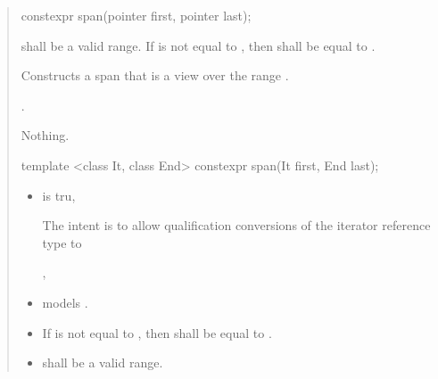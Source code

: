 \documentclass{wg21}
\begin{document}
\begin{quote}
\begin{removedblock}
\begin{itemdecl}
constexpr span(pointer first, pointer last);
\end{itemdecl}
\end{removedblock}
\begin{removedblock}

\begin{itemdescr}
    \pnum
    \requires
     shall be a valid range.
    If  is not equal to ,
    then  shall be equal to .

    \pnum
    \effects
    Constructs a span that is a view over the range .

    \pnum
    \ensures
    .

    \pnum
    \throws
    Nothing.
\end{itemdescr}
\end{removedblock}

\begin{addedblock}
\begin{itemdecl}
template <class It, class End>
constexpr span(It first, End last);
\end{itemdecl}
\end{addedblock}

\begin{addedblock}

\begin{itemdescr}
	 \pnum
	\constraints
	\begin{itemize}
		\item {} is tru,
		\begin{note}The intent is to allow qualification conversions of the iterator reference type to  \end{note},
		\item {} models .
	\end{itemize}

    \expects
    \begin{itemize}
    \item
    If  is not equal to ,
    then  shall be equal to .
    \item {} shall be a valid range.
    \end{itemize}


\end{itemdescr}
\end{addedblock}
\end{quote}
\end{document}
